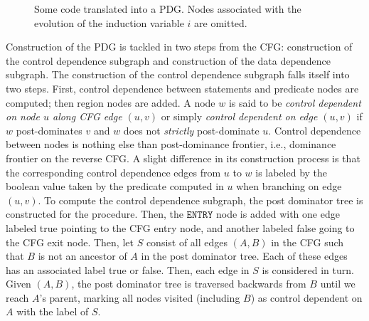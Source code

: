 \begin{figure}
\centering
{}
\caption{Some code translated into a PDG. Nodes associated with the evolution of the induction variable $i$ are omitted.}
\label{fig:pdg}
\end{figure}

Construction of the PDG is tackled in two steps from the CFG: 
construction of the control dependence subgraph and construction of the data dependence subgraph. 
The construction of the control dependence subgraph falls itself into two steps. 
First, control dependence between statements and predicate nodes are computed; 
then region nodes are added. 
A node $w$ is said to be \emph{control dependent on node $u$ along CFG edge $(u,v)$} or simply \emph{control dependent on edge $(u,v)$} if $w$ post-dominates $v$ and $w$ does not \emph{strictly} post-dominate $u$. 
Control dependence between nodes is nothing else than post-dominance frontier, i.e., dominance frontier on the reverse CFG. 
A slight difference in its construction process is that the corresponding control dependence edges from $u$ to $w$ is labeled by the boolean value taken by the predicate computed in $u$ when branching on edge $(u,v)$. 
To compute the control dependence subgraph, the post dominator tree is constructed for the procedure. 
Then, the $\texttt{ENTRY}$ node is added with one edge labeled {\sf true} pointing to the CFG entry node, and another labeled {\sf false} going to the CFG exit node. 
Then, let $S$ consist of all edges $(A,B)$ in the CFG such that $B$ is not an ancestor of $A$ in the post dominator tree. 
Each of these edges has an associated label {\sf true} or {\sf false}. 
Then, each edge in $S$ is considered in turn. 
Given $(A,B)$, the post dominator tree is traversed backwards from $B$ until we reach $A$'s parent, marking all nodes visited (including $B$) as control dependent on $A$ with the label of $S$.

